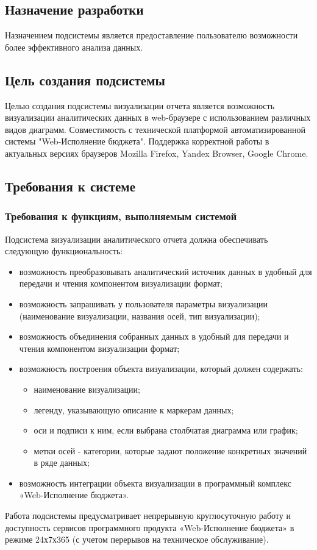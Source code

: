 \documentclass[a4paper]{extarticle}
\begin{document}
\subsection{Назначение разработки}
Назначением подсистемы является предоставление пользователю возможности более эффективного анализа данных.

\subsection{Цель создания подсистемы}
Целью создания подсистемы визуализации отчета является возможность визуализации аналитических данных в web-браузере с использованием различных видов диаграмм. Совместимость с технической платформой автоматизированной системы "Web-Исполнение бюджета". Поддержка корректной работы в актуальных версиях браузеров Mozilla Firefox, Yandex Browser, Google Chrome.

\subsection{Требования к системе}

\subsubsection{Требования к функциям, выполняемым системой}
Подсистема визуализации аналитического отчета должна обеспечивать следующую функциональность:\par
\begin{itemize}
  \item возможность преобразовывать аналитический источник данных в удобный для передачи и чтения компонентом визуализации формат;
  \item возможность запрашивать у пользователя параметры визуализации (наименование визуализации, названия осей, тип визуализации);
  \item возможность объединения собранных данных в удобный для передачи и чтения компонентом визуализации формат;
  \item возможность построения объекта визуализации, который должен содержать:
    \begin{itemize}
    	\item наименование визуализации;
        \item легенду, указывающую описание к маркерам данных;
    	\item оси и подписи к ним, если выбрана столбчатая диаграмма или график;
        \item метки осей - категории, которые задают положение конкретных значений в ряде данных;
    \end{itemize}
  \item возможность интеграции объекта визуализации в программный комплекс «Web-Исполнение бюджета».
\end{itemize}\par
Работа подсистемы предусматривает непрерывную круглосуточную работу и доступность сервисов программного продукта «Web-Исполнение бюджета» в режиме 24х7х365 (с учетом перерывов на техническое обслуживание).
\end{document}
